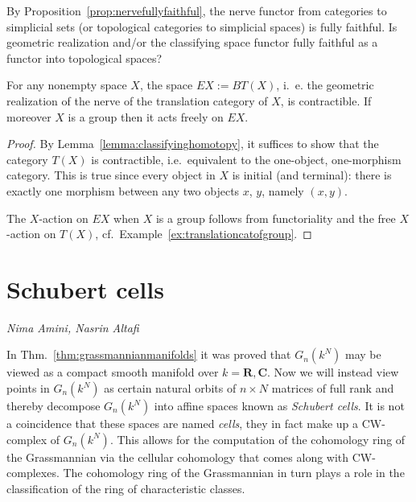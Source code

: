 \documentclass[a4paper,openany]{scrbook}
\newcommand{\chapterauthor}[1]{\hfill\emph{#1}\par\noindent}
\begin{document}
\begin{exer}
By Proposition~\ref{prop:nervefullyfaithful}, the nerve functor from categories to simplicial sets (or topological categories to simplicial spaces) is fully faithful. Is geometric realization and/or the classifying space functor fully faithful as a functor into topological spaces?
\end{exer}

\begin{corollary}\label{cor:EG}
For any nonempty space $X$, the space $EX := BT(X)$, i.~e. the geometric realization of the nerve of the translation category of $X$, is contractible. If moreover $X$ is a group then it acts freely on $EX$.
\end{corollary}
\begin{proof}
By Lemma~\ref{lemma:classifyinghomotopy}, it suffices to show that the category $T(X)$ is contractible, i.e.\ equivalent to the one-object, one-morphism category. This is true since every object in $X$ is initial (and terminal): there is exactly one morphism between any two objects $x$, $y$, namely $(x,y)$.

The $X$-action on $EX$ when $X$ is a group follows from functoriality and the free $X$-action on $T(X)$, cf.~Example~\ref{ex:translationcatofgroup}.
\end{proof}

\section{Schubert cells}


\chapterauthor{Nima Amini, Nasrin Altafi}

In Thm.~\ref{thm:grassmannianmanifolds} it was proved that $G_n(k^N)$ may be viewed as a compact smooth manifold over $k = \mathbf{R}, \mathbf{C}$. 
Now we will instead view points in $G_n(k^N)$ as certain natural orbits of $n \times N$ matrices of full rank and thereby decompose $G_n(k^N)$ into affine spaces known as \textit{Schubert cells}. 
It is not a coincidence that these spaces are named \textit{cells}, they in fact make up a CW-complex of $G_n(k^N)$. 
This allows for the computation of the cohomology ring of the Grassmannian via the cellular cohomology that comes along with CW-complexes. 
The cohomology ring of the Grassmannian in turn plays a role in the classification of the ring of characteristic classes. 
\end{document}
